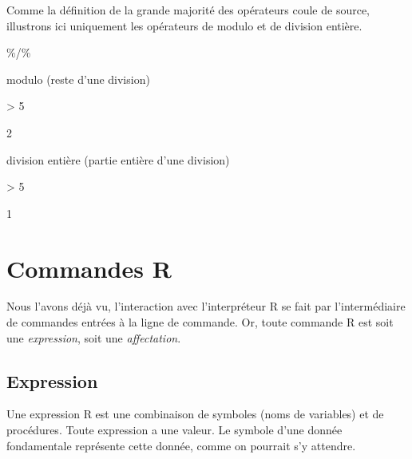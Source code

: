 Comme la définition de la grande majorité des opérateurs coule de
source, illustrons ici uniquement les opérateurs de modulo et de
division entière.

\begin{ttscript}{\%/\%}
\item[\code{\%\%}] modulo (reste d'une division)
\begin{Schunk}
\begin{Sinput}
> 5 %% 3
\end{Sinput}
\begin{Soutput}
[1] 2
\end{Soutput}
\end{Schunk}
\item[\code{\%/\%}] division entière (partie entière d'une division)
\begin{Schunk}
\begin{Sinput}
> 5 %/% 3
\end{Sinput}
\begin{Soutput}
[1] 1
\end{Soutput}
\end{Schunk}
\end{ttscript}


\section{Commandes R}
\label{sec:premiers:commandes}

Nous l'avons déjà vu, l'interaction avec l'interpréteur R se fait par
l'intermédiaire de commandes entrées à la ligne de commande. Or, toute
commande R est soit une \emph{expression}, soit une
\emph{affectation}.

\subsection{Expression}
\label{sec:premiers:commandes:expression}

Une expression R est une combinaison de symboles
(noms de variables) et de procédures. Toute expression a une valeur.
Le symbole d'une donnée fondamentale représente cette donnée, comme on
pourrait s'y attendre.

